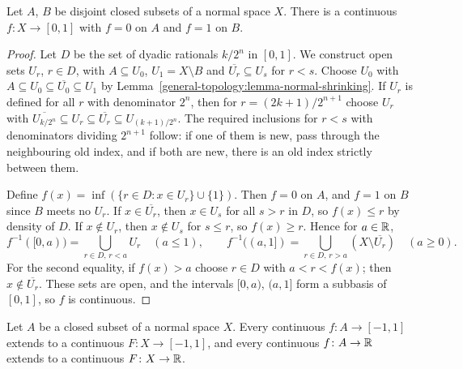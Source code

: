 \begin{theorem}\label{general-topology:theorem-urysohn}
Let $A$, $B$ be disjoint closed subsets of a normal space $X$. There is a continuous $f \colon X \to [0, 1]$ with $f = 0$ on $A$ and $f = 1$ on $B$.
\end{theorem}

\begin{proof}
Let $D$ be the set of dyadic rationals $k/2^n$ in $[0, 1]$. We construct open sets $U_r$, $r \in D$, with $A \subseteq U_0$, $U_1 = X \setminus B$ and
$\overline{U_r} \subseteq U_s$ for $r < s$. Choose $U_0$ with $A \subseteq U_0 \subseteq \overline{U_0} \subseteq U_1$ by
Lemma~\ref{general-topology:lemma-normal-shrinking}. If $U_r$ is defined for all $r$ with denominator $2^n$, then for $r = (2k+1)/2^{n+1}$ choose $U_r$
with $\overline{U_{k/2^n}} \subseteq U_r \subseteq \overline{U_r} \subseteq U_{(k+1)/2^n}$. The required inclusions for $r < s$ with denominators dividing
$2^{n+1}$ follow: if one of them is new, pass through the neighbouring old index, and if both are new, there is an old index strictly between them.

Define $f(x) = \inf(\{r \in D : x \in U_r\} \cup \{1\})$. Then $f = 0$ on $A$, and $f = 1$ on $B$ since $B$ meets no $U_r$. If $x \in \overline{U_r}$, then
$x \in U_s$ for all $s > r$ in $D$, so $f(x) \leq r$ by density of $D$. If $x \notin U_r$, then $x \notin U_s$ for $s \leq r$, so $f(x) \geq r$. Hence for
$a \in \mathbb{R}$,
\[
f^{-1}([0, a)) = \bigcup_{r \in D,\, r < a} U_r \quad (a \leq 1), \qquad f^{-1}((a, 1]) = \bigcup_{r \in D,\, r > a} (X \setminus \overline{U_r}) \quad (a \geq 0).
\]
For the second equality, if $f(x) > a$ choose $r \in D$ with $a < r < f(x)$; then $x \notin \overline{U_r}$. These sets are open, and the intervals
$[0, a)$, $(a, 1]$ form a subbasis of $[0, 1]$, so $f$ is continuous.
\end{proof}

\begin{theorem}\label{general-topology:theorem-tietze}
Let $A$ be a closed subset of a normal space $X$. Every continuous $f \colon A \to [-1, 1]$ extends to a continuous $F \colon X \to [-1, 1]$, and every
continuous $f \colon A \to \mathbb{R}$ extends to a continuous $F \colon X \to \mathbb{R}$.
\end{theorem}

